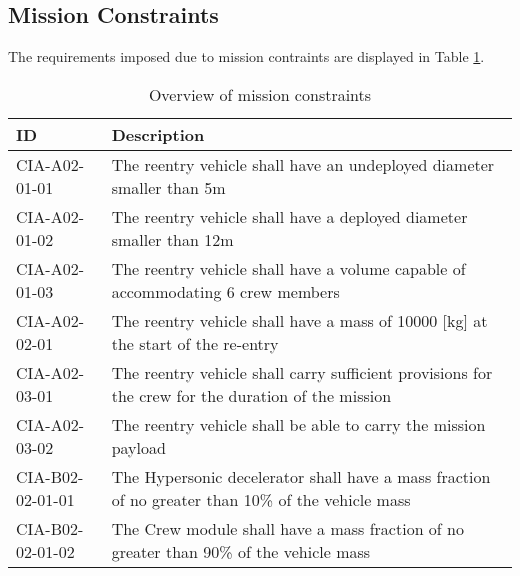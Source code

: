 \subsection{Mission Constraints} \label{sec:MisCon}
The requirements  imposed due to mission contraints are displayed in Table \ref{tab:MissionCon}.
\begin{table}[H]
	\caption{Overview of mission constraints}
	\begin{tabular}{|p{}|p{}|}
    \hline
    ID          & Description                                                                                                      \\ \hline \hline
		CIA-A02-01-01 & The reentry vehicle shall have an undeployed diameter smaller than 5m                         				            \\ \hline
		CIA-A02-01-02 & The reentry vehicle shall have a deployed diameter smaller than 12m                         				            \\ \hline
		CIA-A02-01-03 & The reentry vehicle shall have a volume capable of accommodating 6 crew members                        				            \\ \hline
		CIA-A02-02-01 & The reentry vehicle shall have a mass of 10000 [kg] at the start of the re-entry                       				            \\ \hline
		CIA-A02-03-01 & The reentry vehicle shall carry sufficient provisions for the crew for the duration of the mission \\ \hline
		CIA-A02-03-02 & The reentry vehicle shall be able to carry the mission payload								\\ \hline
		CIA-B02-02-01-01 & The Hypersonic decelerator shall have a mass fraction of no greater than 10\% of the vehicle mass  \\ \hline
		CIA-B02-02-01-02 & The Crew module shall have a mass fraction of no greater than 90\% of the vehicle mass \\ \hline
	
		\end{tabular}
    \label{tab:MissionCon}
\end{table}